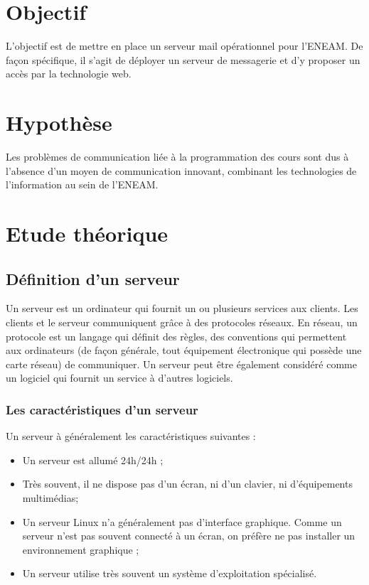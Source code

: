 \documentclass[a4paper,12pt,french]{report} %
\begin{document}
\section{Objectif}
	L'objectif est de mettre en place un serveur mail opérationnel pour l'ENEAM. De façon spécifique, il s'agit de déployer un serveur de messagerie et d'y proposer un accès par la technologie web.
	\section{Hypothèse}
	Les problèmes de communication liée à la programmation des cours sont dus à l'absence d'un moyen de communication innovant, combinant les technologies de l'information au sein de l'ENEAM.
	\section{Etude théorique}
		\subsection{Définition d'un serveur}
		Un serveur est un ordinateur qui fournit un ou plusieurs services aux clients. Les clients et le serveur communiquent grâce à des protocoles réseaux. En réseau, un protocole est un langage qui définit des règles, des conventions qui permettent aux ordinateurs (de façon générale, tout équipement électronique qui possède une carte réseau) de communiquer. Un serveur peut être également considéré comme un logiciel qui fournit un service à d'autres logiciels.

\subsubsection{Les caractéristiques d'un serveur}
Un serveur à généralement les caractéristiques suivantes :
\begin{itemize}
\item Un serveur est allumé 24h/24h ;
\item Très souvent, il ne dispose pas d'un écran, ni d'un clavier, ni d'équipements multimédias; %
\item Un serveur Linux n'a généralement pas d'interface graphique. Comme un serveur n'est pas souvent connecté à un écran, on préfère ne pas installer un environnement graphique ;
\item Un serveur utilise très souvent un système d'exploitation spécialisé.
\end{itemize}
\end{document}
